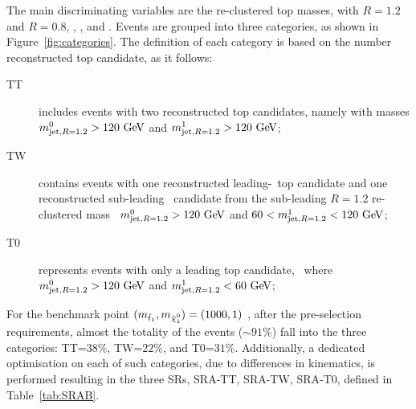 				The main discriminating variables are the re-clustered top masses, with $R = 1.2$ and $R = 0.8$, \mtbmin, \drbb, and \met. Events are grouped into three categories, as shown in Figure~\ref{fig:categories}. The definition of each category is based on the number reconstructed top candidate, as it follows: 
				
				\begin{description}
					\item[TT] includes events with two reconstructed top candidates, namely with masses $\mantikttwelvezero>120\gev$ and $\mantikttwelveone>120\gev$;
					\item[TW] contains events with one reconstructed leading-\pt\ top candidate and one reconstructed sub-leading \Wboson\ candidate from the sub-leading $R = 1.2$ re-clustered mass \ie\ $\mantikttwelvezero>120\gev$ and $60<\mantikttwelveone<120\gev$;
					\item[T0] represents events with only a leading top candidate, \ie\ where $\mantikttwelvezero>120\gev$ and $\mantikttwelveone<60\gev$;
				\end{description}

				\noindent For the benchmark point $(\mstopone, \mninoone) = (1000,1)$ \GeV, after the pre-selection requirements, almost the totality of the events ($\sim 91\%$) fall into the three categories: TT=$38\%$, TW=$22\%$, and T0=$31\%$. Additionally, a  dedicated optimisation on each of such categories, due to differences in kinematics, is performed resulting in the three \acp{SR}, SRA-TT, SRA-TW, SRA-T0, defined in Table~\ref{tab:SRAB}. %
				
